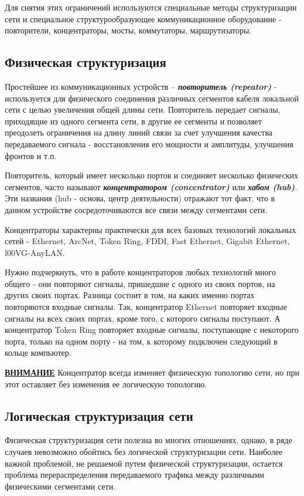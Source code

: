 Для снятия этих ограничений используются специальные методы структуризации сети и специальное структурообразующее коммуникационное оборудование - повторители, концентраторы, мосты, коммутаторы, маршрутизаторы.

\subsection{Физическая структуризация}
Простейшее из коммуникационных устройств – \textbf{\textit{повторитель (repeator)}} - используется для физического соединения различных сегментов кабеля локальной сети с целью увеличения общей длины сети.
Повторитель передает сигналы, приходящие из одного сегмента сети, в другие ее сегменты и позволяет преодолеть ограничения на длину линий связи за счет улучшения качества передаваемого сигнала - восстановления его мощности и амплитуды, улучшения фронтов и т.п.

Повторитель, который имеет несколько портов и соединяет несколько физических сегментов, часто называют \textbf{\textit{концентратором (concentrator)}} или \textbf{\textit{хабом (hub)}}.
Эти названия (hub - основа, центр деятельности) отражают тот факт, что в данном устройстве сосредоточиваются все связи между сегментами сети.

Концентраторы характерны практически для всех базовых технологий локальных сетей - Ethernet, ArcNet, Token Ring, FDDI, Fast Ethernet, Gigabit Ethernet, l00VG-AnyLAN.

Нужно подчеркнуть, что в работе концентраторов любых технологий много общего - они повторяют сигналы, пришедшие с одного из своих портов, на других своих портах.
Разница состоит в том, на каких именно портах повторяются входные сигналы.
Так, концентратор Ethernet повторяет входные сигналы на всех своих портах, кроме того, с которого сигналы поступают.
А концентратор Token Ring повторяет входные сигналы, поступающие с некоторого порта, только на одном порту - на том, к которому подключен следующий в кольце компьютер.

\textbf{\underline{ВНИМАНИЕ}} Концентратор всегда изменяет физическую топологию сети, но при этот оставляет без изменения ее логическую топологию.

\subsection{Логическая структуризация сети}

Физическая структуризация сети полезна во многих отношениях, однако, в ряде случаев невозможно обойтись без логической структуризации сети.
Наиболее важной проблемой, не решаемой путем физической структуризации, остается проблема перераспределения передаваемого трафика между различными физическими сегментами сети.

